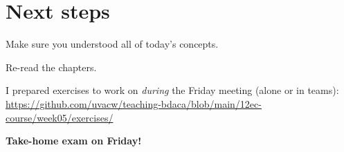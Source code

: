 \documentclass[compress]{beamer}
\begin{document}

\section{Next steps}

\begin{frame}[standout]
Make sure you understood all of today's concepts.

Re-read the chapters.

I prepared exercises to work on \emph{during} the Friday meeting (alone or in teams):
\large{\url{https://github.com/uvacw/teaching-bdaca/blob/main/12ec-course/week05/exercises/}}


\textbf{Take-home exam on Friday!}

\end{frame}





\begin{frame}
	\printbibliography
\end{frame}
\end{document}
